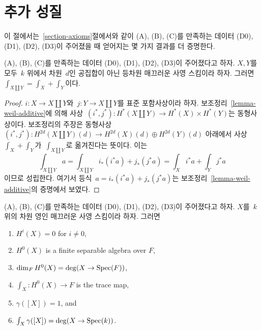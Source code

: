 \section{추가 성질}
\label{section-further}

\noindent
이 절에서는\  \ref{section-axioms}절에서와 같이 (A), (B), (C)를
만족하는 데이터 (D0), (D1), (D2), (D3)이 주어졌을 때 얻어지는
몇 가지 결과를 더 증명한다.

\begin{lemma}
\label{lemma-trace-disjoint-union}
(A), (B), (C)를 만족하는 데이터 (D0), (D1), (D2), (D3)이
주어졌다고 하자. $X, Y$를 모두\  $k$ 위에서 차원\  $d$인 공집합이 아닌
등차원 매끄러운 사영 스킴이라 하자. 그러면\ 
$\int_{X \amalg Y} = \int_X + \int_Y$이다.
\end{lemma}

\begin{proof}
$i : X \to X \amalg Y$와\  $j : Y \to X \amalg Y$를 표준 포함사상이라
하자. 보조정리\  \ref{lemma-weil-additive}에 의해 사상\ 
$(i^*, j^*) : H^*(X \amalg Y) \to H^*(X) \times H^*(Y)$는
동형사상이다. 보조정리의 주장은 동형사상\ 
$(i^*, j^*) : H^{2d}(X \amalg Y)(d) \to H^{2d}(X)(d) \oplus H^{2d}(Y)(d)$
아래에서 사상\  $\int_X + \int_Y$가\  $\int_{X \amalg Y}$로
옮겨진다는 뜻이다. 이는
$$
\int_{X \amalg Y} a =
\int_{X \amalg Y} i_*(i^*a) + j_*(j^*a) =
\int_X i^*a + \int_Y j^*a
$$
이므로 성립한다. 여기서 등식\  $a = i_*(i^*a) + j_*(j^*a)$는
보조정리\  \ref{lemma-weil-additive}의 증명에서 보였다.
\end{proof}

\begin{lemma}
\label{lemma-dim-0}
(A), (B), (C)를 만족하는 데이터 (D0), (D1), (D2), (D3)이
주어졌다고 하자. $X$를\  $k$ 위의 차원 영인 매끄러운 사영 스킴이라
하자. 그러면
\begin{enumerate}
\item $H^i(X) = 0$ for $i \not = 0$,
\item $H^0(X)$ is a finite separable algebra over $F$,
\item $\dim_F H^0(X) = \deg(X \to \mathop{\mathrm{Spec}}(F))$,
\item $\int_X : H^0(X) \to F$ is the trace map,
\item $\gamma([X]) = 1$, and
\item $\int_X \gamma([X]) = \deg(X \to \mathop{\mathrm{Spec}}(k))$.
\end{enumerate}
\end{lemma}


